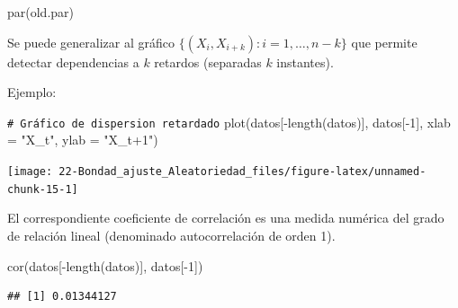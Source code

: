 \documentclass[
]{book}
\newenvironment{Shaded}{\begin{snugshade}}{\end{snugshade}}
\newcommand{\AttributeTok}[1]{\textcolor[rgb]{0.77,0.63,0.00}{#1}}
\newcommand{\CommentTok}[1]{\textcolor[rgb]{0.56,0.35,0.01}{\textit{#1}}}
\newcommand{\DecValTok}[1]{\textcolor[rgb]{0.00,0.00,0.81}{#1}}
\newcommand{\FunctionTok}[1]{\textcolor[rgb]{0.00,0.00,0.00}{#1}}
\newcommand{\NormalTok}[1]{#1}
\newcommand{\SpecialCharTok}[1]{\textcolor[rgb]{0.00,0.00,0.00}{#1}}
\newcommand{\StringTok}[1]{\textcolor[rgb]{0.31,0.60,0.02}{#1}}
\theoremstyle{break}
\theoremstyle{nonumberplain}
\renewcommand{\CommentTok}[1]{\textcolor[rgb]{0.41,0.41,0.41}{\texttt{#1}}}
\begin{document}
\begin{Shaded}
\begin{Highlighting}[]
\FunctionTok{par}\NormalTok{(old.par)}
\end{Highlighting}
\end{Shaded}

Se puede generalizar al gráfico \(\{(X_{i},X_{i+k}) : i = 1, \ldots, n-k \}\)
que permite detectar dependencias a \(k\) retardos
(separadas \(k\) instantes).

Ejemplo:

\begin{Shaded}
\begin{Highlighting}[]
\CommentTok{\# Gráfico de dispersion retardado}
\FunctionTok{plot}\NormalTok{(datos[}\SpecialCharTok{{-}}\FunctionTok{length}\NormalTok{(datos)], datos[}\SpecialCharTok{{-}}\DecValTok{1}\NormalTok{], }\AttributeTok{xlab =} \StringTok{"X\_t"}\NormalTok{, }\AttributeTok{ylab =} \StringTok{"X\_t+1"}\NormalTok{)}
\end{Highlighting}
\end{Shaded}

\begin{center}\texttt{[image: 22-Bondad\_ajuste\_Aleatoriedad\_files/figure-latex/unnamed-chunk-15-1]} \end{center}

El correspondiente coeficiente de correlación es una medida numérica
del grado de relación lineal (denominado autocorrelación de orden 1).

\begin{Shaded}
\begin{Highlighting}[]
\FunctionTok{cor}\NormalTok{(datos[}\SpecialCharTok{{-}}\FunctionTok{length}\NormalTok{(datos)], datos[}\SpecialCharTok{{-}}\DecValTok{1}\NormalTok{])}
\end{Highlighting}
\end{Shaded}

\begin{verbatim}
## [1] 0.01344127
\end{verbatim}
\end{document}
